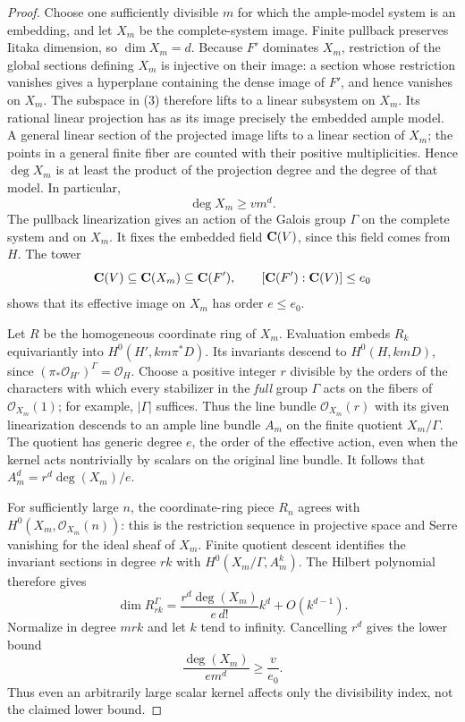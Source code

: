 \begin{proof}
Choose one sufficiently divisible $m$ for which the ample-model
system is an embedding, and let $X_m$ be the complete-system image.
Finite pullback preserves Iitaka dimension, so $\dim X_m=d$.
Because $F'$ dominates $X_m$, restriction of the global sections
defining $X_m$ is injective on their image: a section whose
restriction vanishes gives a hyperplane containing the dense image
of $F'$, and hence vanishes on $X_m$. The subspace in (3) therefore
lifts to a linear subsystem on $X_m$. Its rational linear projection
has as its image precisely the embedded ample model. A general
linear section of the projected image lifts to a linear section of
$X_m$; the points in a general finite fiber are counted with their
positive multiplicities. Hence
$\deg X_m$ is at least the product of the projection degree and
the degree of that model. In particular,
\[
 \deg X_m\geq vm^d.
\]
The pullback linearization gives an action of the Galois group
$\Gamma$ on the complete system and on $X_m$. It fixes the
embedded field $\mathbf C(V)$, since this field comes from $H$.  The
tower
\[
 \mathbf C(V)\subseteq\mathbf C(X_m)\subseteq\mathbf C(F'),
 \qquad[\mathbf C(F'): \mathbf C(V)]\leq e_0
\]
shows that its effective image on $X_m$ has order $e\leq e_0$.

Let $R$ be the homogeneous coordinate ring of $X_m$.  Evaluation
embeds $R_k$ equivariantly into $H^0(H',km\pi^*D)$.  Its invariants
descend to $H^0(H,kmD)$, since
$(\pi_*\mathcal O_{H'})^\Gamma=\mathcal O_H$.
Choose a positive integer $r$ divisible by the orders of the
characters with which every stabilizer in the \emph{full} group
$\Gamma$ acts on the fibers of $\mathcal O_{X_m}(1)$; for example,
$|\Gamma|$ suffices. Thus the line bundle $\mathcal O_{X_m}(r)$
with its given linearization descends to an ample line bundle $A_m$
on the finite quotient $X_m/\Gamma$. The quotient has generic
degree $e$, the order of the effective action, even when the kernel
acts nontrivially by scalars on the original line bundle. It follows
that $A_m^d=r^d\deg(X_m)/e$.

For sufficiently large $n$, the coordinate-ring piece $R_n$ agrees
with $H^0(X_m,\mathcal O_{X_m}(n))$: this is the restriction
sequence in projective space and Serre vanishing for the ideal
sheaf of $X_m$. Finite quotient descent identifies the invariant
sections in degree $rk$ with $H^0(X_m/\Gamma,A_m^k)$.
The Hilbert polynomial therefore gives
\[
 \dim R_{rk}^{\Gamma}
 =\frac{r^d\deg(X_m)}{e\,d!}k^d+O(k^{d-1}).
\]
Normalize in degree $mrk$ and let $k$ tend to infinity. Cancelling
$r^d$ gives the lower bound
\[
 \frac{\deg(X_m)}{em^d}\geq\frac{v}{e_0}.
\]
Thus even an arbitrarily large scalar kernel affects only the
divisibility index, not the claimed lower bound.
\end{proof}

